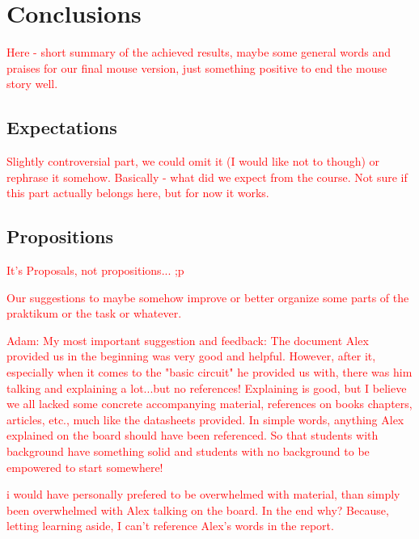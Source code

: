 \section{Conclusions}
\textcolor{red}{
Here - short summary of the achieved results, maybe some general words and praises for our final mouse version, just something positive to end the mouse story well.
}

\subsection{Expectations}
\textcolor{red}{
Slightly controversial part, we could omit it (I would like not to though) or rephrase it somehow. Basically - what did we expect from the course. Not sure if this part actually belongs here, but for now it works.
}
\subsection{Propositions}
\textcolor{red}{It's Proposals, not propositions... ;p}
\textcolor{red}{
Our suggestions to maybe somehow improve or better organize some parts of the praktikum or the task or whatever.

Adam: My most important suggestion and feedback:
The document Alex provided us in the beginning was very good and helpful. However, after it, especially when it comes to the
"basic circuit" he provided us with, there was him talking and explaining a lot...but no references!
Explaining is good, but I believe we all lacked some concrete accompanying material, references on books chapters, articles, etc.,
much like the datasheets provided.
In simple words, anything Alex explained on the board should have been referenced. So that students with background have something
solid and students with no background to be empowered to start somewhere!

i would have personally prefered to be overwhelmed with material, than simply been overwhelmed with Alex talking on the board.
In the end why? Because, letting learning aside, I can't reference Alex's words in the report.
}

